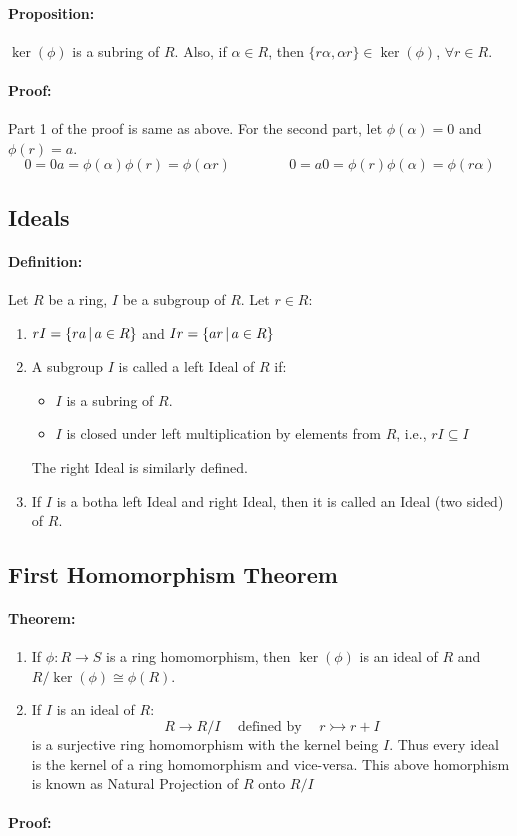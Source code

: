 \documentclass[12pt, oneside]{book}
\begin{document}
\paragraph{Proposition:} \(\ker(\phi)\) is a subring of \(R\).
Also, if \(\alpha \in R\), then \(\{r \alpha, \alpha r\} \in \ker(\phi)\), \(\forall r \in R\).
\paragraph{Proof:} Part 1 of the proof is same as above.
For the second part, let \(\phi(\alpha) = 0\) and \(\phi(r) = a\).
\[0 = 0 a = \phi(\alpha)\phi(r) = \phi(\alpha r) \hspace{50pt} 0 = a0 = \phi(r) \phi(\alpha) = \phi(r \alpha)\]

\subsection{Ideals}
\paragraph{Definition:} Let \(R\) be a ring, \(I\) be a subgroup of \(R\). Let \(r \in R\):
\begin{enumerate}
    \item \(rI = \{ra \; \vline \; a \in R\}\) and \(Ir = \{ar \; \vline \; a \in R\}\) 
    \item A subgroup \(I\) is called a left Ideal of \(R\) if:
    \begin{itemize}
        \item \(I\) is a subring of \(R\).
        \item \(I\) is closed under left multiplication by elements from \(R\), i.e., \(rI \subseteq I\)
    \end{itemize}
    The right Ideal is similarly defined.
    \item If \(I\) is a botha left Ideal and right Ideal, then it is called an Ideal (two sided) of \(R\).
\end{enumerate}

\subsection{First Homomorphism Theorem}
\paragraph{Theorem:}
\begin{enumerate}
    \item If \(\phi: R \rightarrow S\) is a ring homomorphism, then \(\ker(\phi)\) is an ideal of \(R\) and \(R/\ker(\phi) \cong \phi(R)\).
    \item If \(I\) is an ideal of \(R\):
    \[R \rightarrow R/I \hspace{15pt} \text{defined by} \hspace{15pt} r \rightarrowtail r + I\]
    is a surjective ring homomorphism with the kernel being \(I\).
    Thus every ideal is the kernel of a ring homomorphism and vice-versa.
    This above homorphism is known as Natural Projection of \(R\) onto \(R/I\) 
\end{enumerate}
\paragraph{Proof:}
\end{document}
